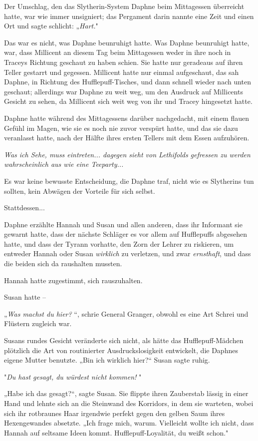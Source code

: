 {\hfill\break Der Umschlag, den das Slytherin-System Daphne beim Mittagessen überreicht hatte, war wie immer unsigniert; das Pergament darin nannte eine Zeit und einen Ort und sagte schlicht: „\emph{Hart.}"

Das war es nicht, was Daphne beunruhigt hatte. Was Daphne beunruhigt hatte, war, dass Millicent an diesem Tag beim Mittagessen weder in ihre noch in Traceys Richtung geschaut zu haben schien. Sie hatte nur geradeaus auf ihren Teller gestarrt und gegessen. Millicent hatte nur einmal aufgeschaut, das sah Daphne, in Richtung des Hufflepuff-Tisches, und dann schnell wieder nach unten geschaut; allerdings war Daphne zu weit weg, um den Ausdruck auf Millicents Gesicht zu sehen, da Millicent sich weit weg von ihr und Tracey hingesetzt hatte.

Daphne hatte während des Mittagessens darüber nachgedacht, mit einem flauen Gefühl im Magen, wie sie es noch nie zuvor verspürt hatte, und das sie dazu veranlasst hatte, nach der Hälfte ihres ersten Tellers mit dem Essen aufzuhören.

\emph{\emph{Was ich Sehe, muss eintreten... dagegen sieht von Lethifolds gefressen zu werden wahrscheinlich aus wie eine Teeparty...}}

Es war keine bewusste Entscheidung, die Daphne traf, nicht wie es Slytherins tun sollten, kein Abwägen der Vorteile für sich selbst.

Stattdessen...

Daphne erzählte Hannah und Susan und allen anderen, dass ihr Informant sie gewarnt hatte, dass der nächste Schläger es vor allem auf Hufflepuffs abgesehen hatte, und dass der Tyrann vorhatte, den Zorn der Lehrer zu riskieren, um entweder Hannah oder Susan \emph{wirklich} zu verletzen, und zwar \emph{ernsthaft}, und dass die beiden sich da raushalten mussten.

Hannah hatte zugestimmt, sich rauszuhalten.

Susan hatte --

\hfill\break „\emph{Was machst du hier?} “, schrie General Granger, obwohl es eine Art Schrei und Flüstern zugleich war.

Susans rundes Gesicht veränderte sich nicht, als hätte das Hufflepuff-Mädchen plötzlich die Art von routinierter Ausdruckslosigkeit entwickelt, die Daphnes eigene Mutter benutzte. „Bin ich wirklich hier?“ Susan sagte ruhig.

"\emph{Du hast gesagt, du würdest nicht kommen!} "

„Habe ich das gesagt?“, sagte Susan. Sie flippte ihren Zauberstab lässig in einer Hand und lehnte sich an die Steinwand des Korridors, in dem sie warteten, wobei sich ihr rotbraunes Haar irgendwie perfekt gegen den gelben Saum ihres Hexengewandes absetzte. „Ich frage mich, warum. Vielleicht wollte ich nicht, dass Hannah auf seltsame Ideen kommt. Hufflepuff-Loyalität, du weißt schon."

}
